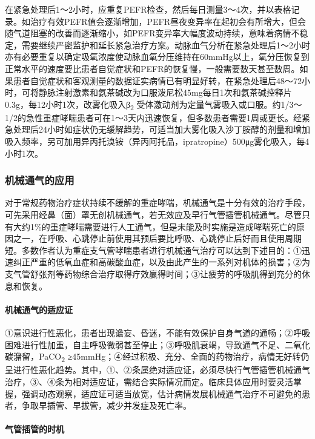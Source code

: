 在紧急处理后1～2小时，应重复PEFR检查，然后每日测量3～4次，并以表格记录。如治疗有效PEFR值会逐渐增加，PEFR昼夜变异率在起初会有所增大，但会随气道阻塞的改善而逐渐缩小，如PEFR变异率大幅度波动持续，意味着病情不稳定，需要继续严密监护和延长紧急治疗方案。动脉血气分析在紧急处理后1～2小时亦有必要重复以确定吸氧浓度使动脉血氧分压维持在60mmHg以上，氧分压恢复到正常水平的速度要比患者自觉症状和PEFR的恢复慢，一般需要数天甚至数周。如果患者自觉症状和客观测量的数据证实病情已有明显好转，在紧急处理后48～72小时，可将静脉注射激素和氨茶碱改为口服泼尼松45mg每日1次和氨茶碱控释片0.3g，每12小时1次，改雾化吸入β\textsubscript{2}
受体激动剂为定量气雾吸入或口服。约1/3～1/2的急性重症哮喘患者可在1～3天内迅速恢复，但多数患者需要1周或更长。经紧急处理后24小时如症状仍无缓解趋势，可适当加大雾化吸入沙丁胺醇的剂量和增加吸入频率，另可加用异丙托溴铵（异丙阿托品，ipratropine）500μg雾化吸入，每4小时1次。

\subsubsection{机械通气的应用}

对于常规药物治疗症状持续不缓解的重症哮喘，机械通气是十分有效的治疗手段，可先采用经鼻（面）罩无创机械通气，若无效应及早行气管插管机械通气。尽管只有大约1\%的重症哮喘需要进行人工通气，但是未能及时实施是造成哮喘死亡的原因之一，在呼吸、心跳停止前使用其预后要比呼吸、心跳停止后好而且使用周期短。多数作者认为重症支气管哮喘患者进行机械通气治疗可以达到下述目的：①迅速纠正严重的低氧血症和高碳酸血症，以及由此产生的一系列对机体的损害；②为支气管舒张剂等药物综合治疗取得疗效赢得时间；③让疲劳的呼吸肌得到充分的休息和恢复。

\paragraph{机械通气的适应证}

①意识进行性恶化，患者出现谵妄、昏迷，不能有效保护自身气道的通畅；②呼吸困难进行性加重，自主呼吸微弱甚至停止；③呼吸肌衰竭，导致通气不足、二氧化碳潴留，PaCO\textsubscript{2}
≥45mmHg；④经过积极、充分、全面的药物治疗，病情无好转仍呈进行性恶化趋势。其中，①、②条属绝对适应证，必须尽快行气管插管机械通气治疗，③、④条为相对适应证，需结合实际情况而定。临床具体应用时要灵活掌握，强调动态观察，适应证可适当放宽，估计病情发展机械通气治疗不可避免的患者，争取早插管、早拔管，减少并发症及死亡率。

\paragraph{气管插管的时机}

